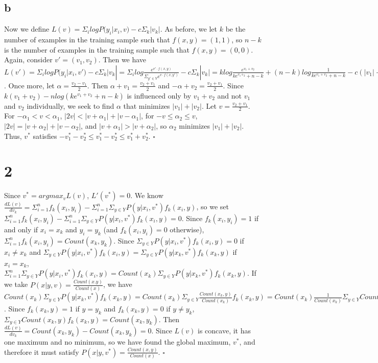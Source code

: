 \documentclass[twoside]{homework}
\begin{document}
\subsection*{b}
Now we define $L(v) = \Sigma_ilogP(y_i|x_i,v) - c\Sigma_k|v_k|$.  As before, we let $k$ be the number of examples in the training sample such that $f(x,y) = (1,1)$, so $n-k$ is the number of examples in the training sample such that $f(x,y) = (0,0)$.  Again, consider $v' = (v_1,v_2)$.  Then we have $L(v') = \Sigma_ilogP(y_i|x_i,v') - c\Sigma_k|v_k| = \Sigma_ilog \frac{e^{v' \cdot f(x,y)}}{\Sigma_{y' \in V}e^{v \cdot f(x,y')}} - c\Sigma_k|v_k| = klog \frac{e^{v_1+v_2}}{ke^{v_1+_2}+n-k} + (n-k)log \frac{1}{ke^{v_1+v_2}+n-k} - c(|v_1|+|v_2|) = k(v_1+v_2) - klog(ke^{v_1+v_2}+n-k) + (n-k)log(1) + (k-n)log(ke^{v_1+v_2}+n-k) - c(|v_1|+|v_2|) = k(v_1+v_2) - nlog(ke^{v_1+v_2}+n-k) - c(|v_1|+|v_2|)$.  Once more, let $\alpha = \frac{v_2-v_1}{2}$.  Then $\alpha + v_1 = \frac{v_2+v_1}{2}$ and $-\alpha + v_2 = \frac{v_2+v_1}{2}$.  Since $k(v_1+v_2) - nlog(ke^{v_1+v_2}+n-k)$ is influenced only by $v_1+v_2$ and not $v_1$ and $v_2$ individually, we seek to find $\alpha$ that minimizes $|v_1|+|v_2|$.  Let $v = \frac{v_2+v_1}{2}$.  For $-\alpha_1 < v < \alpha_1$, $|2v| < |v+\alpha_1| + |v-\alpha_1|$, for $-v \leq \alpha_2 \leq v$, $|2v| = |v+\alpha_2| + |v-\alpha_2|$, and $|v+\alpha_1| > |v+\alpha_2|$, so $\alpha_2$ minimizes $|v_1|+|v_2|$.  Thus, $v^*$ satisfies $-v^*_1-v^*_2 \leq v^*_1-v^*_2 \leq v^*_1+v^*_2$.
$\square$

\section*{2}
Since $v^* = argmax_vL(v)$, $L'(v^*) = 0$.  We know $\frac{dL(v)}{dv_k} = \Sigma_{i=1}^nf_k(x_i,y_i) - \Sigma_{i=1}^n\Sigma_{y \in Y}P(y|x_i,v^*)f_k(x_i,y)$, so we set $\Sigma_{i=1}^nf_k(x_i,y_i) - \Sigma_{i=1}^n\Sigma_{y \in Y}P(y|x_i,v^*)f_k(x_i,y) = 0$.  Since $f_k(x_i,y_i) = 1$ if and only if $x_i = x_k$ and $y_i = y_k$ (and $f_k(x_i,y_i) = 0$ otherwise), $\Sigma_{i=1}^nf_k(x_i,y_i) = Count(x_k,y_k)$.  Since $\Sigma_{y \in Y}P(y|x_i,v^*)f_k(x_i,y) = 0$ if $x_i \neq x_k$ and $\Sigma_{y \in Y}P(y|x_i,v^*)f_k(x_i,y) = \Sigma_{y \in Y}P(y|x_k,v^*)f_k(x_k,y)$ if $x_i = x_k$, $\Sigma_{i=1}^n\Sigma_{y \in Y}P(y|x_i,v^*)f_k(x_i,y) = Count(x_k)\Sigma_{y \in Y}P(y|x_k,v^*)f_k(x_k,y)$.  If we take $P(x|y,v) = \frac{Count(x.y)}{Count(x)}$, we have $Count(x_k)\Sigma_{y \in Y}P(y|x_k,v^*)f_k(x_k,y) = Count(x_k)\Sigma_{y \in Y}\frac{Count(x_k,y)}{Count(x_k)} f_k(x_k,y) = Count(x_k)\frac{1}{Count(x_k)}\Sigma_{y \in Y}Count(x_k,y)f_k(x_k,y) = \Sigma_{y \in Y}Count(x_k,y)f_k(x_k,y)$.  Since $f_k(x_k,y) = 1$ if $y = y_k$ and $f_k(x_k,y) = 0$ if $y \neq y_k$, $\Sigma_{y \in Y}Count(x_k,y)f_k(x_k,y) = Count(x_k,y_k)$.  Then $\frac{dL(v)}{dv_k} = Count(x_k,y_k) - Count(x_k,y_k) = 0$.  Since $L(v)$ is concave, it has one maximum and no minimum, so we have found the global maximum, $v^*$, and therefore it must satisfy $P(x|y,v^*) = \frac{Count(x,y)}{Count(x)}$.
$\square$
\end{document}
